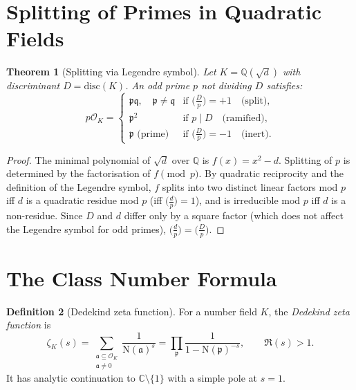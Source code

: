 \documentclass[12pt,a4paper]{amsart}
\newtheorem{theorem}{Theorem}[section]
\theoremstyle{definition}
\newtheorem{definition}[theorem]{Definition}
\newcommand{\Q}{\mathbb{Q}}
\newcommand{\C}{\mathbb{C}}
\newcommand{\OK}{\mathcal{O}_K}
\newcommand{\p}{\mathfrak{p}}
\newcommand{\q}{\mathfrak{q}}
\newcommand{\aaa}{\mathfrak{a}}
\newcommand{\Nm}{\mathrm{N}}
\newcommand{\disc}{\mathrm{disc}}
\begin{document}
\section{Splitting of Primes in Quadratic Fields}

\begin{theorem}[Splitting via Legendre symbol]
\label{thm:quad_split}
Let $K = \Q(\sqrt{d})$ with discriminant $D = \disc(K)$.  An odd prime $p$
not dividing $D$ satisfies:
\[
  p\OK =
  \begin{cases}
    \p\q, \quad \p \ne \q & \text{if } \bigl(\tfrac{D}{p}\bigr) = +1
    \quad\text{(split)}, \\[2pt]
    \p^2 & \text{if } p \mid D
    \quad\text{(ramified)}, \\[2pt]
    \p \text{ (prime)} & \text{if } \bigl(\tfrac{D}{p}\bigr) = -1
    \quad\text{(inert)}.
  \end{cases}
\]
\end{theorem}

\begin{proof}
The minimal polynomial of $\sqrt{d}$ over $\Q$ is $f(x) = x^2 - d$.
Splitting of $p$ is determined by the factorisation of $f \pmod{p}$.
By quadratic reciprocity and the definition of the Legendre symbol,
$f$ splits into two distinct linear factors mod $p$ iff $d$ is a quadratic
residue mod $p$ (iff $\bigl(\tfrac{d}{p}\bigr) = 1$), and is irreducible
mod $p$ iff $d$ is a non-residue.  Since $D$ and $d$ differ only by a
square factor (which does not affect the Legendre symbol for odd primes),
$\bigl(\tfrac{d}{p}\bigr) = \bigl(\tfrac{D}{p}\bigr)$.
\end{proof}

\section{The Class Number Formula}

\begin{definition}[Dedekind zeta function]
\label{def:dedekind_zeta}
For a number field $K$, the \emph{Dedekind zeta function} is
\[
  \zeta_K(s) = \sum_{\substack{\aaa \subseteq \OK \\ \aaa \ne 0}} \frac{1}{\Nm(\aaa)^s}
  = \prod_{\p} \frac{1}{1 - \Nm(\p)^{-s}}, \qquad \Re(s) > 1.
\]
It has analytic continuation to $\C \setminus \{1\}$ with a simple pole at $s=1$.
\end{definition}
\end{document}
